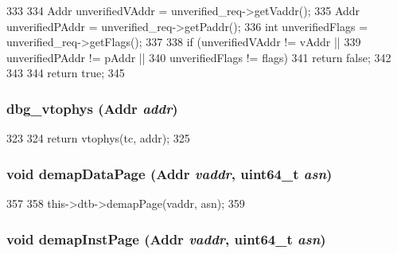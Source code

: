 \begin{DoxyCode}
333 {
334     Addr unverifiedVAddr = unverified_req->getVaddr();
335     Addr unverifiedPAddr = unverified_req->getPaddr();
336     int unverifiedFlags = unverified_req->getFlags();
337 
338     if (unverifiedVAddr != vAddr ||
339         unverifiedPAddr != pAddr ||
340         unverifiedFlags != flags) {
341         return false;
342     }
343 
344     return true;
345 }
\end{DoxyCode}
\hypertarget{classCheckerCPU_a7e2d118d430dcbebd896ba39811ef03b}{
\subsubsection[{dbg\_\-vtophys}]{ dbg\_\-vtophys ({\bf Addr} {\em addr})}}
\label{classCheckerCPU_a7e2d118d430dcbebd896ba39811ef03b}



\begin{DoxyCode}
323 {
324     return vtophys(tc, addr);
325 }
\end{DoxyCode}
\hypertarget{classCheckerCPU_a26789603cc94992d18f8ddedfff96acf}{
\subsubsection[{demapDataPage}]{\setlength{\rightskip}{0pt plus 5cm}void demapDataPage ({\bf Addr} {\em vaddr}, \/  uint64\_\-t {\em asn})}}
\label{classCheckerCPU_a26789603cc94992d18f8ddedfff96acf}



\begin{DoxyCode}
357     {
358         this->dtb->demapPage(vaddr, asn);
359     }
\end{DoxyCode}
\hypertarget{classCheckerCPU_ac8a36d45a839b07f50b73f1eee119615}{
\subsubsection[{demapInstPage}]{\setlength{\rightskip}{0pt plus 5cm}void demapInstPage ({\bf Addr} {\em vaddr}, \/  uint64\_\-t {\em asn})}}
\label{classCheckerCPU_ac8a36d45a839b07f50b73f1eee119615}



